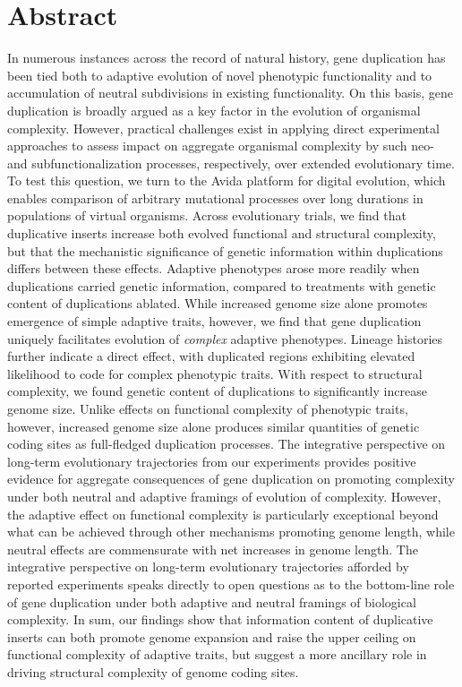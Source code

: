 \section*{Abstract}

In numerous instances across the record of natural history, gene duplication has been tied both to adaptive evolution of novel phenotypic functionality and to accumulation of neutral subdivisions in existing functionality.
On this basis, gene duplication is broadly argued as a key factor in the evolution of organismal complexity.
However, practical challenges exist in applying direct experimental approaches to assess impact on aggregate organismal complexity by such neo- and subfunctionalization processes, respectively, over extended evolutionary time.
To test this question, we turn to the Avida platform for digital evolution, which enables comparison of arbitrary mutational processes over long durations in populations of virtual organisms.
Across evolutionary trials, we find that duplicative inserts increase both evolved functional and structural complexity, but that the mechanistic significance of genetic information within duplications differs between these effects.
Adaptive phenotypes arose more readily when duplications carried genetic information, compared to treatments with genetic content of duplications ablated.
While increased genome size alone promotes emergence of simple adaptive traits, however, we find that gene duplication uniquely facilitates evolution of \textit{complex} adaptive phenotypes.
Lineage histories further indicate a direct effect, with duplicated regions exhibiting elevated likelihood to code for complex phenotypic traits.
With respect to structural complexity, we found genetic content of duplications to significantly increase genome size.
Unlike effects on functional complexity of phenotypic traits, however, increased genome size alone produces similar quantities of genetic coding sites as full-fledged duplication processes.
The integrative perspective on long-term evolutionary trajectories from our experiments provides positive evidence for aggregate consequences of gene duplication on promoting complexity under both neutral and adaptive framings of evolution of complexity.
However, the adaptive effect on functional complexity is particularly exceptional beyond what can be achieved through other mechanisms promoting genome length, while neutral effects are commensurate with net increases in genome length.
The integrative perspective on long-term evolutionary trajectories afforded by reported experiments speaks directly to open questions as to the bottom-line role of gene duplication under both adaptive and neutral framings of biological complexity.
In sum, our findings show that information content of duplicative inserts can both promote genome expansion and raise the upper ceiling on functional complexity of adaptive traits, but suggest a more ancillary role in driving structural complexity of genome coding sites.
